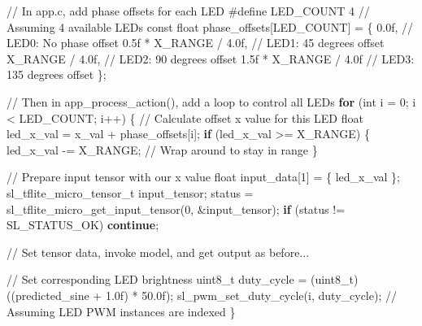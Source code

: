 \documentclass[
  9pt,
  letterpaper,
  abstract,
  titlepage]{scrbook}
\newenvironment{Shaded}{\begin{snugshade}}{\end{snugshade}}
\newcommand{\BuiltInTok}[1]{\textcolor[rgb]{0.00,0.23,0.31}{#1}}
\newcommand{\CommentTok}[1]{\textcolor[rgb]{0.37,0.37,0.37}{#1}}
\newcommand{\ControlFlowTok}[1]{\textcolor[rgb]{0.00,0.23,0.31}{\textbf{#1}}}
\newcommand{\DataTypeTok}[1]{\textcolor[rgb]{0.68,0.00,0.00}{#1}}
\newcommand{\DecValTok}[1]{\textcolor[rgb]{0.68,0.00,0.00}{#1}}
\newcommand{\FloatTok}[1]{\textcolor[rgb]{0.68,0.00,0.00}{#1}}
\newcommand{\NormalTok}[1]{\textcolor[rgb]{0.00,0.23,0.31}{#1}}
\newcommand{\OperatorTok}[1]{\textcolor[rgb]{0.37,0.37,0.37}{#1}}
\newcommand{\PreprocessorTok}[1]{\textcolor[rgb]{0.68,0.00,0.00}{#1}}
\begin{document}
\begin{Shaded}
\begin{Highlighting}[]
\CommentTok{// In app.c, add phase offsets for each LED}
\PreprocessorTok{\#define LED\_COUNT }\DecValTok{4}\PreprocessorTok{  }\CommentTok{// Assuming 4 available LEDs}
\DataTypeTok{const} \DataTypeTok{float}\NormalTok{ phase\_offsets}\OperatorTok{[}\NormalTok{LED\_COUNT}\OperatorTok{]} \OperatorTok{=} \OperatorTok{\{}
  \FloatTok{0.0}\BuiltInTok{f}\OperatorTok{,}                  \CommentTok{// LED0: No phase offset}
  \FloatTok{0.5}\BuiltInTok{f} \OperatorTok{*}\NormalTok{ X\_RANGE }\OperatorTok{/} \FloatTok{4.0}\BuiltInTok{f}\OperatorTok{,} \CommentTok{// LED1: 45 degrees offset}
\NormalTok{  X\_RANGE }\OperatorTok{/} \FloatTok{4.0}\BuiltInTok{f}\OperatorTok{,}        \CommentTok{// LED2: 90 degrees offset}
  \FloatTok{1.5}\BuiltInTok{f} \OperatorTok{*}\NormalTok{ X\_RANGE }\OperatorTok{/} \FloatTok{4.0}\BuiltInTok{f}  \CommentTok{// LED3: 135 degrees offset}
\OperatorTok{\};}

\CommentTok{// Then in app\_process\_action(), add a loop to control all LEDs}
\ControlFlowTok{for} \OperatorTok{(}\DataTypeTok{int}\NormalTok{ i }\OperatorTok{=} \DecValTok{0}\OperatorTok{;}\NormalTok{ i }\OperatorTok{\textless{}}\NormalTok{ LED\_COUNT}\OperatorTok{;}\NormalTok{ i}\OperatorTok{++)} \OperatorTok{\{}
  \CommentTok{// Calculate offset x value for this LED}
  \DataTypeTok{float}\NormalTok{ led\_x\_val }\OperatorTok{=}\NormalTok{ x\_val }\OperatorTok{+}\NormalTok{ phase\_offsets}\OperatorTok{[}\NormalTok{i}\OperatorTok{];}
  \ControlFlowTok{if} \OperatorTok{(}\NormalTok{led\_x\_val }\OperatorTok{\textgreater{}=}\NormalTok{ X\_RANGE}\OperatorTok{)} \OperatorTok{\{}
\NormalTok{    led\_x\_val }\OperatorTok{{-}=}\NormalTok{ X\_RANGE}\OperatorTok{;}  \CommentTok{// Wrap around to stay in range}
  \OperatorTok{\}}
  
  \CommentTok{// Prepare input tensor with our x value}
  \DataTypeTok{float}\NormalTok{ input\_data}\OperatorTok{[}\DecValTok{1}\OperatorTok{]} \OperatorTok{=} \OperatorTok{\{}\NormalTok{ led\_x\_val }\OperatorTok{\};}
\NormalTok{  sl\_tflite\_micro\_tensor\_t input\_tensor}\OperatorTok{;}
\NormalTok{  status }\OperatorTok{=}\NormalTok{ sl\_tflite\_micro\_get\_input\_tensor}\OperatorTok{(}\DecValTok{0}\OperatorTok{,} \OperatorTok{\&}\NormalTok{input\_tensor}\OperatorTok{);}
  \ControlFlowTok{if} \OperatorTok{(}\NormalTok{status }\OperatorTok{!=}\NormalTok{ SL\_STATUS\_OK}\OperatorTok{)} \ControlFlowTok{continue}\OperatorTok{;}
  
  \CommentTok{// Set tensor data, invoke model, and get output as before...}
  
  \CommentTok{// Set corresponding LED brightness}
  \DataTypeTok{uint8\_t}\NormalTok{ duty\_cycle }\OperatorTok{=} \OperatorTok{(}\DataTypeTok{uint8\_t}\OperatorTok{)((}\NormalTok{predicted\_sine }\OperatorTok{+} \FloatTok{1.0}\BuiltInTok{f}\OperatorTok{)} \OperatorTok{*} \FloatTok{50.0}\BuiltInTok{f}\OperatorTok{);}
\NormalTok{  sl\_pwm\_set\_duty\_cycle}\OperatorTok{(}\NormalTok{i}\OperatorTok{,}\NormalTok{ duty\_cycle}\OperatorTok{);}  \CommentTok{// Assuming LED PWM instances are indexed}
\OperatorTok{\}}
\end{Highlighting}
\end{Shaded}
\end{document}
